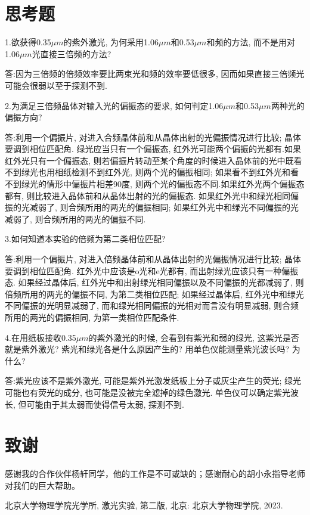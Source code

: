 \documentclass[aps,pre,12pt,preprint,%
	onecolumn,showpacs,showkeys,nofootinbib]{revtex4-2}
\begin{document}
\section{思考题}
1.欲获得0.35$\mu m$的紫外激光, 为何采用1.06$\mu m$和0.53$\mu m$和频的方法, 而不是用对1.06$\mu m$光直接三倍频的方法?
\par 答:因为三倍频的倍频效率要比两束光和频的效率要低很多, 因而如果直接三倍频光可能会很弱以至于探测不到.

2.为满足三倍频晶体对输入光的偏振态的要求, 如何判定1.06$\mu m$和0.53$\mu m$两种光的偏振方向? 
\par 答:利用一个偏振片, 对进入合频晶体前和从晶体出射的光偏振情况进行比较; 晶体要调到相位匹配角. 绿光应当只有一个偏振态, 红外光可能两个偏振的光都有.如果红外光只有一个偏振态, 则若偏振片转动至某个角度的时候进入晶体前的光中既看不到绿光也用相纸检测不到红外光, 则两个光的偏振相同; 如果看不到红外光和看不到绿光的情形中偏振片相差90度, 则两个光的偏振态不同.如果红外光两个偏振态都有, 则比较进入晶体前和从晶体出射的光的偏振态. 如果红外光中和绿光相同偏振的光减弱了, 则合频所用的两光的偏振相同; 如果红外光中和绿光不同偏振的光减弱了, 则合频所用的两光的偏振不同.

3.如何知道本实验的倍频为第二类相位匹配?
\par 答:利用一个偏振片, 对进入倍频晶体前和从晶体出射的光偏振情况进行比较; 晶体要调到相位匹配角. 红外光中应该是o光和e光都有, 而出射绿光应该只有一种偏振态. 如果经过晶体后, 红外光中和出射绿光相同偏振以及不同偏振的光都减弱了, 则倍频所用的两光的偏振不同, 为第二类相位匹配; 如果经过晶体后, 红外光中和绿光不同偏振的光明显减弱了, 而和绿光相同偏振的光相对而言没有明显减弱, 则合频所用的两光的偏振相同, 为第一类相位匹配条件.

4.在用纸板接收0.35$\mu m$的紫外激光的时候, 会看到有紫光和弱的绿光, 这紫光是否就是紫外激光? 紫光和绿光各是什么原因产生的? 用单色仪能测量紫光波长吗? 为什么? 
\par 答:紫光应该不是紫外激光, 可能是紫外光激发纸板上分子或灰尘产生的荧光; 绿光可能也有荧光的成分, 也可能是没被完全滤掉的绿色激光. 单色仪可以确定紫光波长, 但可能由于其太弱而使得信号太弱, 探测不到.
\section{致谢}
	感谢我的合作伙伴杨轩同学，他的工作是不可或缺的；感谢耐心的胡小永指导老师对我们的巨大帮助。
\begin{thebibliography}{99}
	北京大学物理学院光学所, 激光实验, 第二版, 北京: 北京大学物理学院, 2023.
\end{thebibliography}
\clearpage
\end{document}
